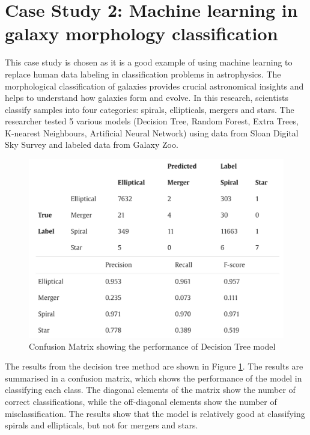 \documentclass[aps,prb,twocolumn,superscriptaddress,floatfix]{revtex4-2}
\begin{document}
\section{Case Study 2: Machine learning in galaxy morphology classification}
This case study is chosen as it is a good example of using machine learning to replace human data labeling in classification problems in astrophysics\cite{rodirguezarticle}.
The morphological classification of galaxies provides crucial astronomical insights and helps to understand how galaxies form and evolve.
In this research, scientists classify samples into four categories: spirals, ellipticals, mergers and stars\cite{reza2021galaxy}. The researcher tested 5 various models (Decision Tree, Random Forest, Extra Trees, K-nearest Neighbours, Artificial Neural Network) using data from Sloan Digital Sky Survey and labeled data from Galaxy Zoo\cite{zooniverseZooniverse}. 
\begin{figure}[h]
    \includegraphics[clip=true,width=\columnwidth]{CS_Galaxy_DT.PNG}
    \caption{Confusion Matrix showing the performance of Decision Tree model}
    \label{fig: DT}
\end{figure}
The results from the decision tree method are shown in Figure \ref{fig: DT}. The results are summarised in a confusion matrix, which shows the performance of the model in classifying each class. The diagonal elements of the matrix show the number of correct classifications, while the off-diagonal elements show the number of misclassification. The results show that the model is relatively good at classifying spirals and ellipticals, but not for mergers and stars.
\end{document}
